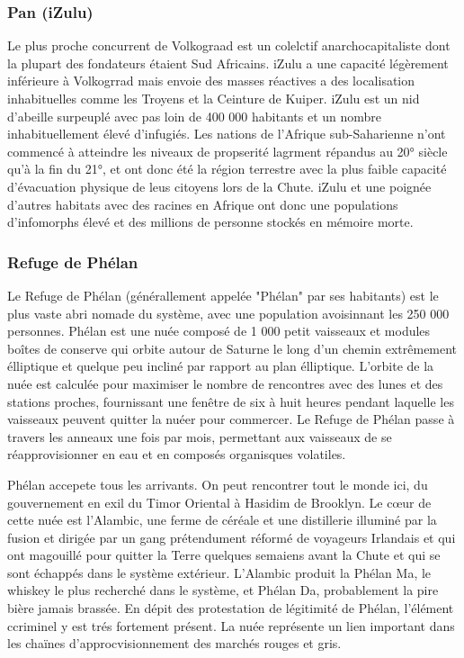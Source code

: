                                                                      \subsubsection{Pan (iZulu)} \label{sec:pan-izulu} 

                                                                     Le plus proche concurrent de Volkograad est un colelctif anarchocapitaliste dont la plupart des fondateurs étaient Sud Africains. iZulu a une capacité légèrement inférieure à Volkogrrad mais envoie des masses réactives a des localisation inhabituelles comme les Troyens et la Ceinture de Kuiper. iZulu est un nid d'abeille surpeuplé avec pas loin de 400 000 habitants et un nombre inhabituellement élevé d'infugiés. Les nations de l'Afrique sub-Saharienne n'ont commencé à atteindre les niveaux de propserité lagrment répandus au 20° siècle qu'à la fin du 21°, et ont donc été la région terrestre avec la plus faible capacité d'évacuation physique de leus citoyens lors de la Chute. iZulu et une poignée d'autres habitats avec des racines en Afrique ont donc une populations d'infomorphs élevé et des millions de personne stockés en mémoire morte. 

                                                                     \subsubsection{Refuge de Phélan} \label{sec:phelans-recourse} 

                                                                     Le Refuge de Phélan (générallement appelée "Phélan" par ses habitants) est le plus vaste abri nomade du système, avec une population avoisinnant les 250 000 personnes. Phélan est une nuée composé de 1 000 petit vaisseaux et modules boîtes de conserve qui orbite autour de Saturne le long d'un chemin extrêmement élliptique et quelque peu incliné par rapport au plan élliptique. L'orbite de la nuée est calculée pour maximiser le nombre de rencontres avec des lunes et des stations proches, fournissant une fenêtre de six à huit heures pendant laquelle les vaisseaux peuvent quitter la nuéer pour commercer. Le Refuge de Phélan passe à travers les anneaux une fois par mois, permettant aux vaisseaux de se réapprovisionner en eau et en composés organisques volatiles. 

                                                                     Phélan accepete tous les arrivants. On peut rencontrer tout le monde ici, du gouvernement en exil du Timor Oriental à Hasidim de Brooklyn. Le cœur de cette nuée est l'Alambic, une ferme de céréale et une distillerie illuminé par la fusion et dirigée par un gang prétendument réformé de voyageurs Irlandais et qui ont magouillé pour quitter la Terre quelques semaiens avant la Chute et qui se sont échappés dans le système extérieur. L'Alambic produit la Phélan Ma, le whiskey le plus recherché dans le système, et Phélan Da, probablement la pire bière jamais brassée. En dépit des protestation de légitimité de Phélan, l'élément ccriminel y est trés fortement présent. La nuée représente un lien important dans les chaïnes d'approcvisionnement des marchés rouges et gris. 


